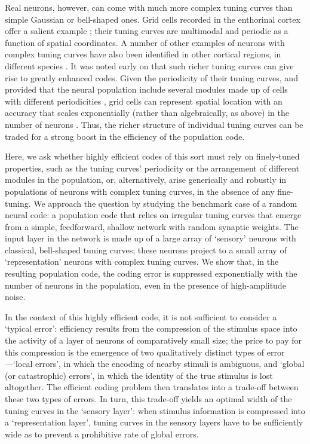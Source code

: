 \documentclass[a4paper]{article}%
\begin{document}
Real neurons, however, can come with much more complex tuning curves than
simple Gaussian or bell-shaped ones. Grid cells recorded in the enthorinal
cortex offer a salient example
\cite[]{Hafting2005MicrostructureCortex,Doeller2010EvidenceNetwork,Yartsev2011GridBats,Killian2012ACortex}
; their tuning curves are multimodal and periodic as a function of spatial
coordinates. A number of other examples of neurons with complex tuning curves
have also been identified in other cortical regions, in different species
\cite[]{Kadia2003SpectralCharacteristics,Sofroniew2015NeuralLocomotion,Lalazar2016TuningConnectivity,Gaucher2020ComplexitySpecies,Eliav2021MultiscaleBats}. It was noted early on that such richer tuning curves can give rise to
greatly enhanced codes. Given the periodicity of their tuning curves, and
provided that the neural population include several modules made up of cells
with different periodicities \cite[]{Fiete2008WhatLocation,Wei2015ACells}, grid
cells can represent spatial location with an accuracy that scales
exponentially (rather than algebraically, as above) in the number of neurons
\cite[]{Sreenivasan2011GridComputation,Mathis2012ResolutionNeurons,Burak2014SpatialCortex}. Thus, the richer structure of individual tuning curves can be traded for a
strong boost in the efficiency of the population code.

Here, we ask whether highly efficient codes of this sort must rely on
finely-tuned properties, such as the tuning curves' periodicity or the
arrangement of different modules in the population, or, alternatively, arise
generically and robustly in populations of neurons with complex tuning curves,
in the absence of any fine-tuning. We approach the question by studying the
benchmark case of a random neural code: a population code that relies on
irregular tuning curves that emerge from a simple, feedforward, shallow
network with random synaptic weights. The input layer in the network is made
up of a large array of `sensory' neurons with classical, bell-shaped tuning
curves; these neurons project to a small array of `representation' neurons
with complex tuning curves. We show that, in the resulting population code,
the coding error is suppressed exponentially with the number of neurons in the
population, even in the presence of high-amplitude noise.

In the context of this highly efficient code, it is not sufficient to consider
a `typical error': efficiency results from the compression of the stimulus
space into the activity of a layer of neurons of comparatively small size; the
price to pay for this compression is the emergence of two qualitatively
distinct types of error---`local errors', in which the encoding of nearby
stimuli is ambiguous, and `global (or catastrophic) errors', in which the
identity of the true stimulus is lost altogether. The efficient coding problem
then translates into a trade-off between these two types of errors. In turn,
this trade-off yields an optimal width of the tuning curves in the `sensory
layer': when stimulus information is compressed into a `representation layer',
tuning curves in the sensory layers have to be sufficiently wide as to prevent
a prohibitive rate of global errors.
\end{document}
